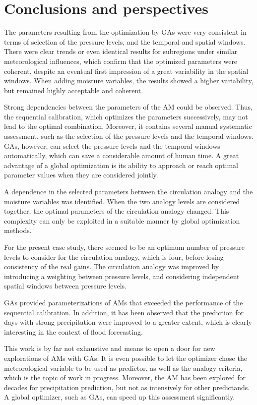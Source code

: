 \documentclass[review]{elsarticle}
\begin{document}
\section{Conclusions and perspectives}
\label{sec:conclusions}


The parameters resulting from the optimization by GAs were very consistent in terms of selection of the pressure levels, and the temporal and spatial windows. There were clear trends or even identical results for subregions under similar meteorological influences, which confirm that the optimized parameters were coherent, despite an eventual first impression of a great variability in the spatial windows. When adding moisture variables, the results showed a higher variability, but remained highly acceptable and coherent.

Strong dependencies between the parameters of the AM could be observed. Thus, the sequential calibration, which optimizes the parameters successively, may not lead to the optimal combination. Moreover, it contains several manual systematic assessment, such as the selection of the pressure levels and the temporal windows. GAs, however, can select the pressure levels and the temporal windows automatically, which can save a considerable amount of human time. A great advantage of a global optimization is its ability to approach or reach optimal parameter values when they are considered jointly. 

A dependence in the selected parameters between the circulation analogy and the moisture variables was identified. When the two analogy levels are considered together, the optimal parameters of the circulation analogy changed. This complexity can only be exploited in a suitable manner by global optimization methods.

For the present case study, there seemed to be an optimum number of pressure levels to consider for the circulation analogy, which is four, before losing consistency of the real gains. The circulation analogy was improved by introducing a weighting between pressure levels, and considering independent spatial windows between pressure levels.

GAs provided parameterizations of AMs that exceeded the performance of the sequential calibration. In addition, it has been observed that the prediction for days with strong precipitation were improved to a greater extent, which is clearly interesting in the context of flood forecasting.

This work is by far not exhaustive and means to open a door for new explorations of AMs with GAs. It is even possible to let the optimizer chose the meteorological variable to be used as predictor, as well as the analogy criteria, which is the topic of work in progress. Moreover, the AM has been explored for decades for precipitation prediction, but not as intensively for other predictands. A global optimizer, such as GAs, can speed up this assessment significantly.
\end{document}
